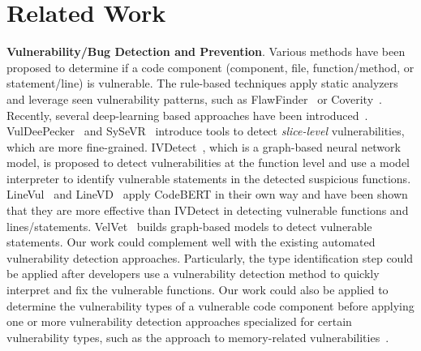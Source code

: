 \section{Related Work}
\label{sec:related_work}

\textbf{Vulnerability/Bug Detection and Prevention}. Various methods have been proposed to determine if a code component (component, file, function/method, or statement/line) is vulnerable. The rule-based techniques apply static analyzers and leverage seen vulnerability patterns, such as FlawFinder~\cite{FlawFinder} or Coverity~\cite{Coverity}. Recently, several deep-learning based approaches have been introduced~\cite{survey_papers, poster, vuldeeppeaker, vulsniper, devign, are_we_there,mvd,issta_22}. 
VulDeePecker~\cite{vuldeeppeaker} and SySeVR~\cite{sysevr} introduce tools to detect \textit{slice-level} vulnerabilities, which are more fine-grained.
IVDetect~\cite{ivdetect}, which is a graph-based neural network model, is proposed to detect vulnerabilities at the function level and use a model interpreter to identify vulnerable statements in the detected suspicious functions. LineVul~\cite{linevul} and LineVD~\cite{linevd} apply CodeBERT in their own way and have been shown that they are more effective than IVDetect in detecting vulnerable functions and lines/statements. VelVet~\cite{velvet} builds graph-based models to detect vulnerable statements. Our work could complement well with the existing automated vulnerability detection approaches. Particularly, the type identification step could be applied after developers use a vulnerability detection method to quickly interpret and fix the vulnerable functions.
%
Our work could also be applied to determine the vulnerability types of a vulnerable code component before applying one or more vulnerability detection approaches specialized for certain vulnerability types, such as the approach to memory-related vulnerabilities~\cite{mvd}.
%


